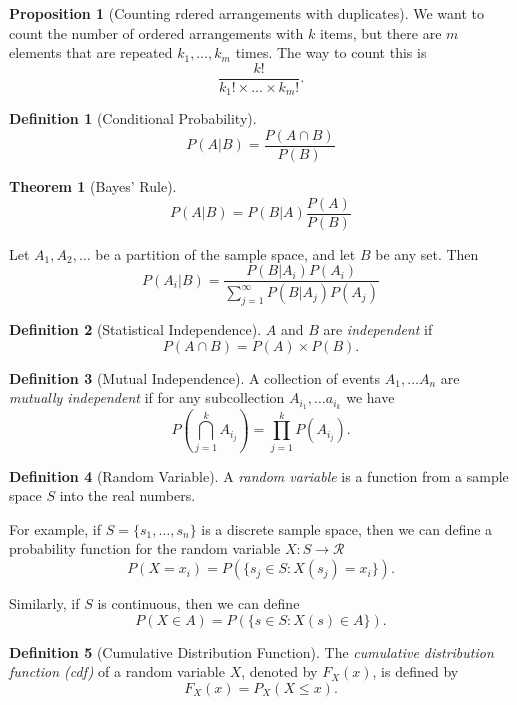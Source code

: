 \documentclass[12pt, letterpaper]{article}
\theoremstyle{definition}
\newtheorem*{defn}{Definition}
\newtheorem*{prop}{Proposition}
\newtheorem*{thm}{Theorem}
\theoremstyle{remark}
\begin{document}
\begin{prop}[Counting rdered arrangements with duplicates]
    We want to count the number of ordered arrangements with \(k\) items, but there are \(m\) elements that are repeated
    \(k_1, \ldots, k_m\) times. The way to count this is
    \[\frac{k!}{k_1! \times \ldots \times k_m!}.\]
    
\end{prop}

\begin{defn}[Conditional Probability]
    \[P(A|B) = \frac{P(A \cap B)}{P(B)}\]
\end{defn}

\begin{thm}[Bayes' Rule]
    \[P(A|B) = P(B|A) \frac{P(A)}{P(B)}\]
    
    Let \(A_1, A_2, \ldots  \) be a partition of the sample space, and let \(B\) be any set. Then
    \[P(A_i | B) = \frac{P(B|A_i)P(A_i)}{\sum_{j=1}^{\infty} P(B|A_j)P(A_j)}\]
\end{thm}

\begin{defn}[Statistical Independence]
    \(A\) and \(B\) are \textit{independent} if 
    \[P(A \cap B) = P(A) \times P(B).\]
\end{defn}

\begin{defn}[Mutual Independence]
    A collection of events \(A_1, \ldots A_n\) are \textit{mutually independent} if for any subcollection \(A_{i_1}, \ldots a_{i_k}\) we have
    \[P(\bigcap_{j=1}^k A_{i_j}) = \prod_{j=1}^k P(A_{i_j}).\]
\end{defn}

\begin{defn}[Random Variable]
    A \textit{random variable} is a function from a sample space \(S\) into the real numbers.

    For example, if \(S = \{s_1, \ldots, s_n\}\) is a discrete sample space, then we can define a probability function for the random variable \(X: S \rightarrow \mathcal{R}\)
    \[P(X=x_i) = P(\{s_j \in S : X(s_j) = x_i\}).\]

    Similarly, if \(S\) is continuous, then we can define
    \[P(X \in A) = P(\{s \in S : X(s) \in A\}).\]
\end{defn}

\begin{defn}[Cumulative Distribution Function]
    The \textit{cumulative distribution function (cdf)} of a random variable \(X\), denoted by \(F_X(x)\), is defined by
    \[F_X(x) = P_X(X \leq x).\]
\end{defn}
\end{document}
